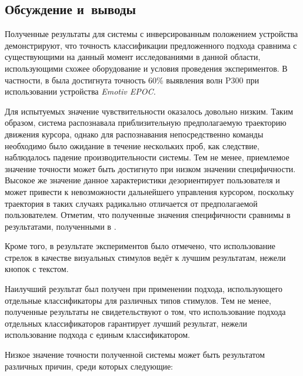 \documentclass[12pt,fleqn]{article}
\begin{document}
\subsection{Обсуждение и~выводы}
	\par Полученные результаты для системы с инверсированным положением устройства демонстрируют, что точность классификации предложенного подхода сравнима с существующими на данный момент исследованиями в данной области, использующими схожее оборудование и условия проведения экспериментов. В частности, в \cite{rhyme} была достигнута точность 60\% выявления волн P300 при использовании устройства {\it Emotiv EPOC.}
	\par Для испытуемых значение чувствительности оказалось довольно низким. Таким образом, система распознавала приблизительную предполагаемую траекторию движения курсора, однако для распознавания непосредственно команды необходимо было ожидание в течение нескольких проб, как следствие, наблюдалось падение производительности системы. Тем не менее, приемлемое значение точности может быть достигнуто при низком значении специфичности. Высокое же значение данное характеристики дезориентирует пользователя и может привести к невозможности дальнейшего управления курсором, поскольку траектория в таких случаях радикально отличается от предполагаемой пользователем. Отметим, что полученные значения специфичности сравнимы в результатами, полученными в \cite{Kanoh}.
	\par Кроме того, в результате экспериментов было отмечено, что использование стрелок в качестве визуальных стимулов ведёт к лучшим результатам, нежели кнопок с текстом.
	\par Наилучший результат был получен при применении подхода, использующего отдельные классификаторы для различных типов стимулов. Тем не менее, полученные результаты не свидетельствуют о том, что использование подхода отдельных классификаторов гарантирует лучший результат, нежели использование подхода с единым классификатором.
	\par Низкое значение точности полученной системы может быть результатом различных причин, среди которых следующие:
\end{document}
